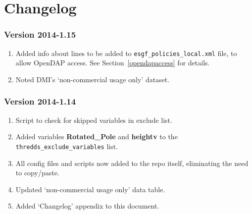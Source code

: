 \chapter{Changelog}
\subsection{Version 2014-1.15}
\begin{enumerate}
\item Added info about lines to be added to \texttt{esgf\_policies\_local.xml} file, to allow OpenDAP access. See Section~\ref{opendapaccess} for details.
\item Noted DMI's `non-commercial usage only' dataset.
\end{enumerate}
\subsection{Version 2014-1.14}
\begin{enumerate}
\item Script to check for skipped variables in exclude list.
\item Added variables \textbf{Rotated\_Pole} and \textbf{heightv} to the \texttt{thredds\_exclude\_variables} list.
\item All config files and scripts now added to the repo itself, eliminating the need to copy/paste.
\item Updated `non-commercial usage only' data table.
\item Added `Changelog' appendix to this document.
\end{enumerate}
